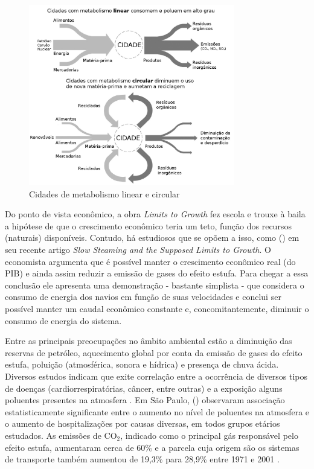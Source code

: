 \begin{figure}[htb]%
    \caption{\label{fig:cidade-metabolismos}Cidades de metabolismo linear e circular}%
    \begin{center}%
        \includegraphics[width=0.80\textwidth]{./imagens/richard-linear-circular.jpg}%
    \end{center}%
\end{figure}%

Do ponto de vista econômico, a obra \emph{Limits to Growth} fez escola e trouxe à baila a hipótese de que o crescimento econômico teria um teto, função dos recursos (naturais) disponíveis. Contudo, há estudiosos que se opõem a isso, como  (\citeyear{KRUGMAN2014}) em seu recente artigo \emph{Slow Steaming and the Supposed Limits to Growth}. O economista argumenta que é possível manter o crescimento econômico real (do PIB) e ainda assim reduzir a emissão de gases do efeito estufa. Para chegar a essa conclusão ele apresenta uma demonstração - bastante simplista - que considera o consumo de energia dos navios em função de suas velocidades e conclui ser possível manter um caudal econômico constante e, concomitantemente, diminuir o consumo de energia do sistema.

Entre as principais preocupações no âmbito ambiental estão a diminuição das reservas de petróleo, aquecimento global por conta da emissão de gases do efeito estufa, poluição (atmosférica, sonora e hídrica) e presença de chuva ácida. Diversos estudos indicam que exite correlação entre a ocorrência de diversos tipos de doenças (cardiorrespiratórias, câncer, entre outras) e a exposição alguns poluentes presentes na atmosfera \cite{WHO2000,WHO2006,BRUNEKREEF2012,MIRANDA2012}. Em São Paulo,  (\citeyear{GOUVEIA2006}) observaram associação estatisticamente significante entre o aumento no nível de poluentes na atmosfera e o aumento de hospitalizações por causas diversas, em todos grupos etários estudados. As emissões de CO$_2$, indicado como o principal gás responsável pelo efeito estufa, aumentaram cerca de 60\% e a parcela cuja origem são os sistemas de transporte também aumentou de 19,3\% para 28,9\% entre 1971 e 2001 \cite{BANISTER2005}.


